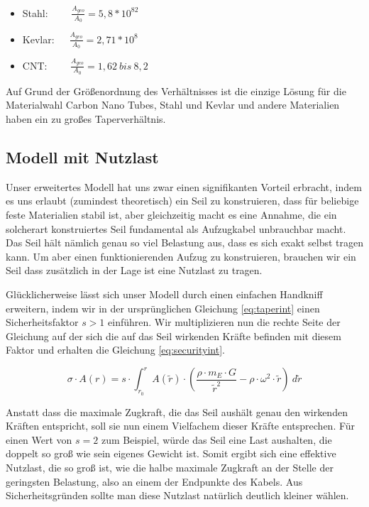 \documentclass[a4paper, 10pt]{report}
\begin{document}
\begin{itemize}
\item Stahl: \ \ \ \ $\frac{A_{geo}}{A_0} = 5,8 *10^82$
\item Kevlar:\ \ \   $\frac{A_{geo}}{A_0} = 2,71 *10^8$
\item CNT: \ \ \ \ $\frac{A_{geo}}{A_0} = 1,62\ bis\ 8,2 $ 
\end{itemize}

Auf Grund der Größenordnung des Verhältnisses ist die einzige Lösung für die Materialwahl Carbon Nano Tubes, Stahl und Kevlar und andere Materialien haben ein zu großes Taperverhältnis.

\subsection{Modell mit Nutzlast}

Unser erweitertes Modell hat uns zwar einen signifikanten Vorteil erbracht, indem es uns erlaubt (zumindest theoretisch) ein Seil zu konstruieren, dass für beliebige feste Materialien stabil ist, aber gleichzeitig macht es eine Annahme, die ein solcherart konstruiertes Seil fundamental als Aufzugkabel unbrauchbar macht. Das Seil hält nämlich genau so viel Belastung aus, dass es sich exakt selbst tragen kann. Um aber einen funktionierenden Aufzug zu konstruieren, brauchen wir ein Seil dass zusätzlich in der Lage ist eine Nutzlast zu tragen.

Glücklicherweise lässt sich unser Modell durch einen einfachen Handkniff erweitern, indem wir in der ursprünglichen Gleichung \ref{eq:taperint} einen Sicherheitsfaktor $s>1$ einführen. Wir multiplizieren nun die rechte Seite der Gleichung auf der sich die auf das Seil wirkenden Kräfte befinden mit diesem Faktor und erhalten die Gleichung \ref{eq:securityint}.

\begin{equation}
\sigma \cdot A(r) = s \cdot \int_{r_0}^{r} A(\tilde{r}) \cdot (\frac{\rho\cdot m_E \cdot G}{\tilde{r}^2} - \rho \cdot \omega^2 \cdot \tilde{r})\ d\tilde{r}
\label{eq:securityint}
\end{equation}

Anstatt dass die maximale Zugkraft, die das Seil aushält genau den wirkenden Kräften entspricht, soll sie nun einem Vielfachem dieser Kräfte entsprechen. Für einen Wert von $s=2$ zum Beispiel, würde das Seil eine Last aushalten, die doppelt so groß wie sein eigenes Gewicht ist. Somit ergibt sich eine effektive Nutzlast, die so groß ist, wie die halbe maximale Zugkraft an der Stelle der geringsten Belastung, also an einem der Endpunkte des Kabels. Aus Sicherheitsgründen sollte man diese Nutzlast natürlich deutlich kleiner wählen.
\end{document}
